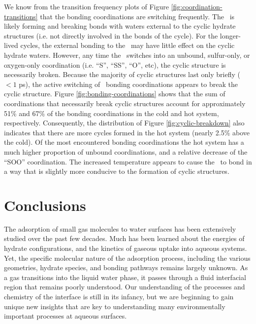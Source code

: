 \documentclass{article}
\begin{document}
We know from the transition frequency plots of Figure \ref{fig:coordination-transitions} that the bonding coordinations are switching frequently. The \suldiox~is likely forming and breaking bonds with waters external to the cyclic hydrate structures (i.e. not directly involved in the bonds of the cycle). For the longer-lived cycles, the external bonding to the \suldiox~may have little effect on the cyclic hydrate waters. However, any time the \suldiox~switches into an unbound, sulfur-only, or oxygen-only coordination (i.e. ``S'', ``SS'', ``O'', etc), the cyclic structure is necessarily broken. Because the majority of cyclic structures last only briefly ($<1$ ps), the active switching of \suldiox~bonding coordinations appears to break the cyclic structure. Figure \ref{fig:bonding-coordinations} shows that the sum of coordinations that necessarily break cyclic structures account for approximately 51\% and 67\% of the bonding coordinations in the cold and hot system, respectively. Consequently, the distribution of Figure \ref{fig:cyclic-breakdown} also indicates that there are more cycles formed in the hot system (nearly 2.5\% above the cold). Of the most encountered bonding coordinations the hot system has a much higher proportion of unbound coordinations, and a relative decrease of the ``SOO'' coordination. The increased temperature appears to cause the \suldiox~to bond in a way that is slightly more conducive to the formation of cyclic structures. %



\section {Conclusions}

The adsorption of small gas molecules to water surfaces has been extensively studied over the past few decades. Much has been learned about the energies of hydrate configurations, and the kinetics of gaseous uptake into aqueous systems. Yet, the specific molecular nature of the adsorption process, including the various geometries, hydrate species, and bonding pathways remains largely unknown. As a gas transitions into the liquid water phase, it passes through a fluid interfacial region that remains poorly understood. Our understanding of the processes and chemistry of the interface is still in its infancy, but we are beginning to gain unique new insights that are key to understanding many environmentally important processes at aqueous surfaces.
\end{document}
